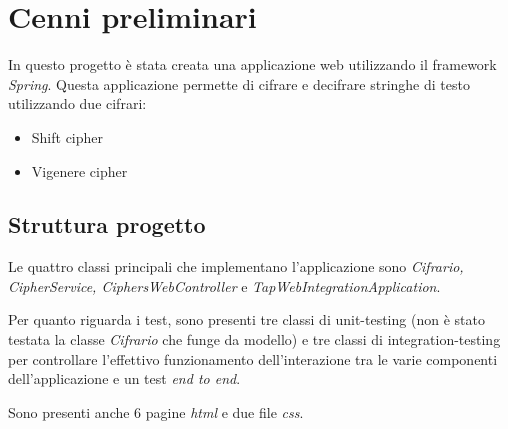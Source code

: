 \documentclass[12pt]{article}
\newcommand{\sectionline}{
	\begin{center}
		\resizebox{0.5\linewidth}{1ex}{
			\begin{tikzpicture}
			\node  (C) at (0,0) {};
			\node (D) at (9,0) {};
			\path (C) to [ornament=83] (D);
			\end{tikzpicture}
		}
	\end{center}
}
\begin{document}
\section{Cenni preliminari}

	In questo progetto è stata creata una applicazione web utilizzando il framework \emph{Spring}. Questa applicazione permette di cifrare e decifrare stringhe di testo utilizzando due cifrari:
	\begin{itemize}
		\item Shift cipher
		\item Vigenere cipher
	\end{itemize}
	
	\subsection{Struttura progetto}
		Le quattro classi principali che implementano l'applicazione sono \emph{Cifrario, CipherService, CiphersWebController} e \emph{TapWebIntegrationApplication}.
		
		Per quanto riguarda i test, sono presenti tre classi di unit-testing (non è stato testata la classe \emph{Cifrario} che funge da modello) e tre classi di integration-testing per controllare l'effettivo funzionamento dell'interazione tra le varie componenti dell'applicazione e un test \emph{end to end}.
		
		Sono presenti anche 6 pagine \emph{html} e due file \emph{css}.
	
	\sectionline
	
\end{document}
